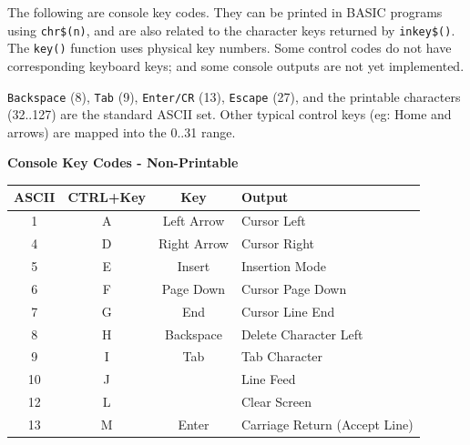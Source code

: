\documentclass[12pt]{article}
\newcommand{\MonoSp}[1] {\fontsize{10pt}{10pt}\selectfont\texttt{#1}\normalsize}
\begin{document}
The following are console key codes.
They can be printed in BASIC programs using \MonoSp{chr\$(n)},
and are also related to the character keys returned by \MonoSp{inkey\$()}.
The \MonoSp{key()} function uses physical key numbers.
Some control codes do not have corresponding keyboard keys;
and some console outputs are not yet implemented.
\newline

\MonoSp{Backspace} (8), \MonoSp{Tab} (9), \MonoSp{Enter/CR} (13), \MonoSp{Escape} (27),
and the printable characters (32..127) are the standard ASCII set.
Other typical control keys (eg: Home and arrows) are mapped into the 0..31 range.

\begin{table}[h]
\centering\textbf{Console Key Codes - Non-Printable}                              \\
\begin{tabular}{ | c | c | c | l | }                                                 \hline
\textbf{ASCII} & \textbf{CTRL+Key} & \textbf{Key} & \textbf{Output}               \\ \hline
1              & A                 & Left Arrow   & Cursor Left                   \\ \hline
4              & D                 & Right Arrow  & Cursor Right                  \\ \hline
5              & E                 & Insert       & Insertion Mode                \\ \hline
6              & F                 & Page Down    & Cursor Page Down              \\ \hline
7              & G                 & End          & Cursor Line End               \\ \hline
8              & H                 & Backspace    & Delete Character Left         \\ \hline
9              & I                 & Tab          & Tab Character                 \\ \hline
10             & J                 &              & Line Feed                     \\ \hline
12             & L                 &              & Clear Screen                  \\ \hline
13             & M                 & Enter        & Carriage Return (Accept Line) \\ \hline

\end{tabular}
\end{table}
\end{document}
